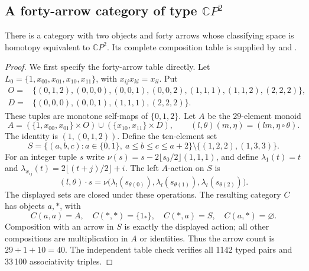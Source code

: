 \subsection{A forty-arrow category of type $\mathbb CP^2$}
\label{C:CP2-upper40-section}

\begin{proposition}\label{C:CP2-upper40}
There is a category with two objects and forty arrows whose
classifying space is homotopy equivalent to $\mathbb CP^2$.
Its complete composition table is supplied by
 and
.
\end{proposition}
\begin{proof}
We first specify the forty-arrow table directly. Let
$L_0=\{1,x_{00},x_{01},x_{10},x_{11}\}$, with
$x_{ij}x_{kl}=x_{il}$. Put
\[
\begin{split}
 O={}&\{(0,1,2),(0,0,0),(0,0,1),(0,0,2),
             (1,1,1),(1,1,2),(2,2,2)\},\\
 D={}&\{(0,0,0),(0,0,1),(1,1,1),(2,2,2)\}.
\end{split}
\]
These tuples are monotone self-maps of $\{0,1,2\}$.
Let $A$ be the 29-element monoid
\[
 A=(\{1,x_{00},x_{01}\}\times O)
       \cup(\{x_{10},x_{11}\}\times D),
 \qquad
 (l,\theta)(m,\eta)=(lm,\eta\circ\theta).
\]
The identity is $(1,(0,1,2))$. Define the ten-element set
\[
 S=\{(a,b,c):a\in\{0,1\},\ a\leq b\leq c\leq a+2\}
          \setminus\{(1,2,2),(1,3,3)\}.
\]
For an integer tuple $s$ write
$\nu(s)=s-2\lfloor s_0/2\rfloor(1,1,1)$, and define
$\lambda_1(t)=t$ and
$\lambda_{x_{ij}}(t)=2\lfloor(t+j)/2\rfloor+i$.
The left $A$-action on $S$ is
\[
 (l,\theta)\cdot s
   =\nu\bigl(\lambda_l(s_{\theta(0)}),
              \lambda_l(s_{\theta(1)}),
              \lambda_l(s_{\theta(2)})\bigr).
\]
The displayed sets are closed under these operations. The resulting
category $C$ has objects $a,*$, with
\[
 C(a,a)=A,\quad C(*,*)=\{1_*\},\quad
 C(*,a)=S,\quad C(a,*)=\varnothing.
\]
Composition with an arrow in $S$ is exactly the displayed action;
all other compositions are multiplication in $A$ or identities.
Thus the arrow count is $29+1+10=40$.
The independent table check verifies all 1142 typed pairs and
33\,100 associativity triples.


\end{proof}
